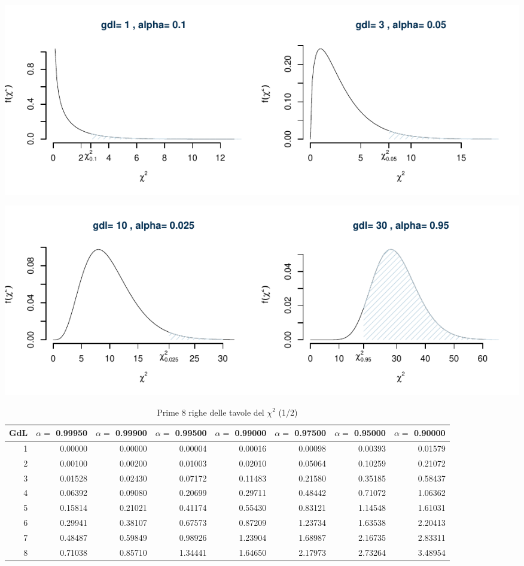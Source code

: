 \documentclass[
  11pt,
]{book}
\theoremstyle{mytheoremstyle}
\theoremstyle{mydefstyle}
\begin{document}
\begin{center}\includegraphics{Appunti_di_Statistica_2025_files/figure-latex/09-Statistiche-Campionarie_3-1} \end{center}

\begin{center}\includegraphics{Appunti_di_Statistica_2025_files/figure-latex/09-Statistiche-Campionarie_4-1} \end{center}

\begin{table}
\centering
\caption{\label{tab:chi1}Prime 8 righe delle tavole del $\chi^2$ (1/2)}
\centering
\fontsize{7}{9}\selectfont
\begin{tabular}[t]{rrrrrrrr}
\toprule
GdL & $\alpha=$ 0.99950 & $\alpha=$ 0.99900 & $\alpha=$ 0.99500 & $\alpha=$ 0.99000 & $\alpha=$ 0.97500 & $\alpha=$ 0.95000 & $\alpha=$ 0.90000\\
\midrule
1 & 0.00000 & 0.00000 & 0.00004 & 0.00016 & 0.00098 & 0.00393 & 0.01579\\
2 & 0.00100 & 0.00200 & 0.01003 & 0.02010 & 0.05064 & 0.10259 & 0.21072\\
3 & 0.01528 & 0.02430 & 0.07172 & 0.11483 & 0.21580 & 0.35185 & 0.58437\\
4 & 0.06392 & 0.09080 & 0.20699 & 0.29711 & 0.48442 & 0.71072 & 1.06362\\
5 & 0.15814 & 0.21021 & 0.41174 & 0.55430 & 0.83121 & 1.14548 & 1.61031\\
6 & 0.29941 & 0.38107 & 0.67573 & 0.87209 & 1.23734 & 1.63538 & 2.20413\\
7 & 0.48487 & 0.59849 & 0.98926 & 1.23904 & 1.68987 & 2.16735 & 2.83311\\
8 & 0.71038 & 0.85710 & 1.34441 & 1.64650 & 2.17973 & 2.73264 & 3.48954\\
\bottomrule
\end{tabular}
\end{table}
\end{document}
